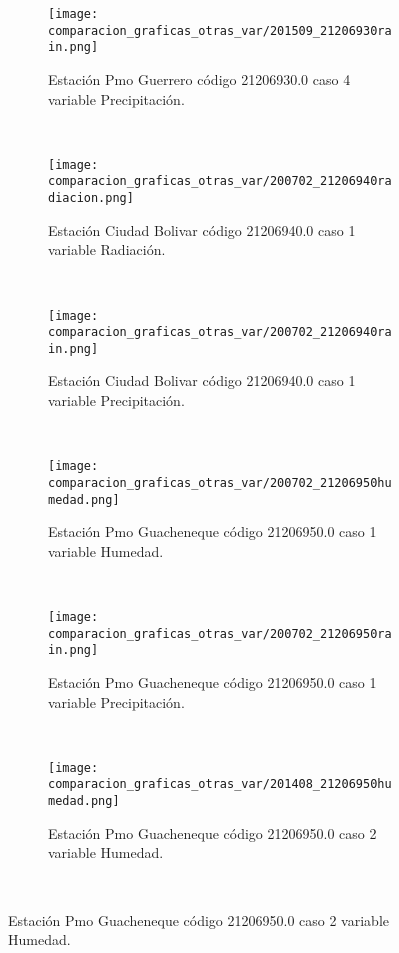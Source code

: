 \begin{figure}[H]
\centering
\begin{subfigure}[normla]{0.4\textwidth}
\caption{Estación Pmo Guerrero código 21206930.0 caso 4 variable Precipitación.}
\texttt{[image: comparacion\_graficas\_otras\_var/201509\_21206930rain.png]}
\end{subfigure}
~
\begin{subfigure}[normla]{0.4\textwidth}
\caption{Estación Ciudad Bolivar código 21206940.0 caso 1 variable Radiación.}
\texttt{[image: comparacion\_graficas\_otras\_var/200702\_21206940radiacion.png]}
\end{subfigure}
~
\begin{subfigure}[normla]{0.4\textwidth}
\caption{Estación Ciudad Bolivar código 21206940.0 caso 1 variable Precipitación.}
\texttt{[image: comparacion\_graficas\_otras\_var/200702\_21206940rain.png]}
\end{subfigure}
~
\begin{subfigure}[normla]{0.4\textwidth}
\caption{Estación Pmo Guacheneque código 21206950.0 caso 1 variable Humedad.}
\texttt{[image: comparacion\_graficas\_otras\_var/200702\_21206950humedad.png]}
\end{subfigure}
~
\begin{subfigure}[normla]{0.4\textwidth}
\caption{Estación Pmo Guacheneque código 21206950.0 caso 1 variable Precipitación.}
\texttt{[image: comparacion\_graficas\_otras\_var/200702\_21206950rain.png]}
\end{subfigure}
~
\begin{subfigure}[normla]{0.4\textwidth}
\caption{Estación Pmo Guacheneque código 21206950.0 caso 2 variable Humedad.}
\texttt{[image: comparacion\_graficas\_otras\_var/201408\_21206950humedad.png]}
\end{subfigure}
~
\end{figure}
           
